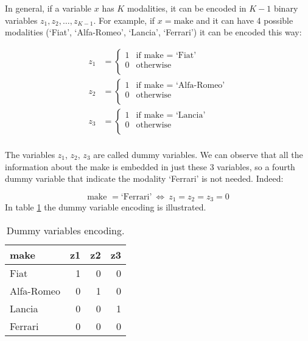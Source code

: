 \documentclass[a4paper, nobind]{templates/ociamthesis}
\theoremstyle{definition}
\theoremstyle{definition}
\theoremstyle{definition}
\theoremstyle{remark}
\begin{document}
In general, if a variable \(x\) has \(K\) modalities, it can be encoded in \(K-1\) binary variables \(z_1, z_2, \dots, z_{K-1}\). For example, if \(x = \text{make}\) and it can have 4 possible modalities (`Fiat', `Alfa-Romeo', `Lancia', `Ferrari') it can be encoded this way:

\begin{align*}
z_1 & = \begin{cases}
1 & \text{if } \text{make } = \text{ `Fiat'} \\
0 & \text{otherwise} \\
\end{cases}
\\
z_2 & = \begin{cases}
1 & \text{if } \text{make } = \text{ `Alfa-Romeo'} \\
0 & \text{otherwise} \\
\end{cases}
\\
z_3 & = \begin{cases}
1 & \text{if } \text{make } = \text{ `Lancia'} \\
0 & \text{otherwise} \\
\end{cases}
\\
\end{align*}

The variables \(z_1\), \(z_2\), \(z_3\) are called dummy variables. We can observe that all the information about the make is embedded in just these 3 variables, so a fourth dummy variable that indicate the modality `Ferrari' is not needed. Indeed:

\[
\text{make } = \text{`Ferrari'} \ \Longleftrightarrow \ z_1=z_2=z_3=0
\]
In table \ref{tab:dummy-variables} the dummy variable encoding is illustrated.

\begin{table}[!h]

\caption{\label{tab:dummy-variables}Dummy variables encoding.}
\centering
\begin{tabular}[t]{lrrr}

make & z1 & z2 & z3\\
\hline
Fiat & 1 & 0 & 0\\
Alfa-Romeo & 0 & 1 & 0\\
Lancia & 0 & 0 & 1\\
Ferrari & 0 & 0 & 0\\

\end{tabular}
\end{table}
\end{document}
